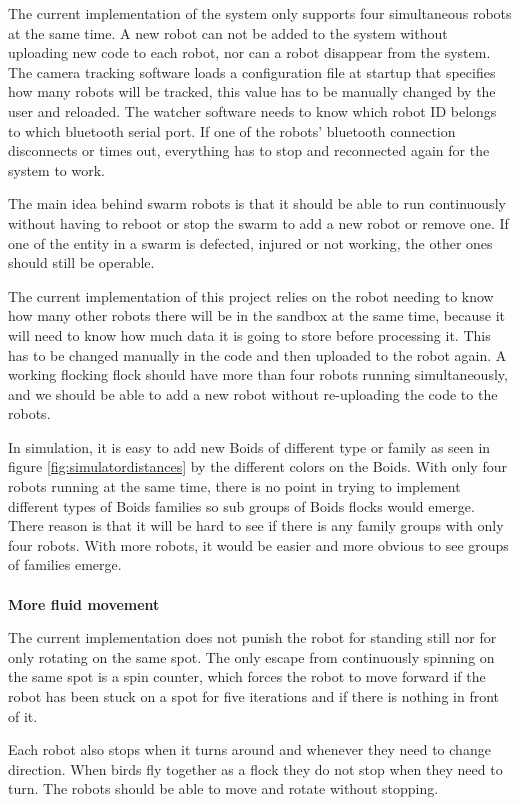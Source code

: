 The current implementation of the system only supports four simultaneous robots at the same time. A new robot can not be added to the system without uploading new code to each robot, nor can a robot disappear from the system. The camera tracking software loads a configuration file at startup that specifies how many robots will be tracked, this value has to be manually changed by the user and reloaded.
The watcher software needs to know which robot ID belongs to which bluetooth serial port. If one of the robots' bluetooth connection disconnects or times out, everything has to stop and reconnected again for the system to work.

The main idea behind swarm robots is that it should be able to run continuously without having to reboot or stop the swarm to add a new robot or remove one. If one of the entity in a swarm is defected, injured or not working, the other ones should still be operable.

The current implementation of this project relies on the robot needing to know how many other robots there will be in the sandbox at the same time, because it will need to know how much data it is going to store before processing it. This has to be changed manually in the code and then uploaded to the robot again.
A working flocking flock should have more than four robots running simultaneously, and we should be able to add a new robot without re-uploading the code to the robots.

In simulation, it is easy to add new Boids of different type or family as seen in figure \ref{fig:simulatordistances} by the different colors on the Boids. With only four robots running at the same time, there is no point in trying to implement different types of Boids families so sub groups of Boids flocks would emerge. There reason is that it will be hard to see if there is any family groups with only four robots. With more robots, it would be easier and more obvious to see groups of families emerge. \\\\
\textbf{More fluid movement}

The current implementation does not punish the robot for standing still nor for only rotating on the same spot. The only escape from continuously spinning on the same spot is a spin counter, which forces the robot to move forward if the robot has been stuck on a spot for five iterations and if there is nothing in front of it. 

Each robot also stops when it turns around and whenever they need to change direction. When birds fly together as a flock they do not stop when they need to turn. The robots should be able to move and rotate without stopping.

